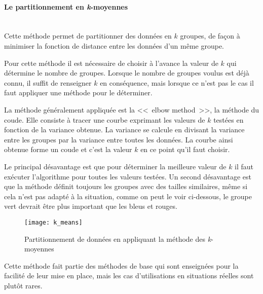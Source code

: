 \paragraph*{Le partitionnement en \textit{k}-moyennes}
~\\

Cette méthode permet de partitionner des données en $k$ groupes, de façon à minimiser la fonction de distance entre les données d'un même groupe.

Pour cette méthode il est nécessaire de choisir à l'avance la valeur de $k$ qui détermine le nombre de groupes.
Lorsque le nombre de groupes voulus est déjà connu, il suffit de renseigner $k$ en conséquence, mais lorsque ce n'est pas le cas il faut appliquer une méthode pour le déterminer.

La méthode généralement appliquée est la <<~elbow method~>>, la méthode du coude.
Elle consiste à tracer une courbe exprimant les valeurs de $k$ testées en fonction de la variance obtenue.
La variance se calcule en divisant la variance entre les groupes par la variance entre toutes les données.
La courbe ainsi obtenue forme un coude et c'est la valeur $k$ en ce point qu'il faut choisir.

Le principal désavantage est que pour déterminer la meilleure valeur de $k$ il faut exécuter l'algorithme pour toutes les valeurs testées.
Un second désavantage est que la méthode définit toujours les groupes avec des tailles similaires, même si cela n'est pas adapté à la situation, comme on peut le voir ci-dessous, le groupe vert devrait être plus important que les bleus et rouges.

\FloatBarrier
\begin{figure}[h!]
    \begin{minipage}[c]{0.45\textwidth}
        \begin{center}
            \texttt{[image: k\_means]}
        \end{center}
    \end{minipage}\hfill
    \begin{minipage}[c]{0.45\textwidth}
        \caption{Partitionnement de données en appliquant la méthode des \textit{k}-moyennes}
        \label{figure:k_means}
    \end{minipage}
\end{figure}
\FloatBarrier

Cette méthode fait partie des méthodes de base qui sont enseignées pour la facilité de leur mise en place, mais les cas d'utilisations en situations réelles sont plutôt rares.

